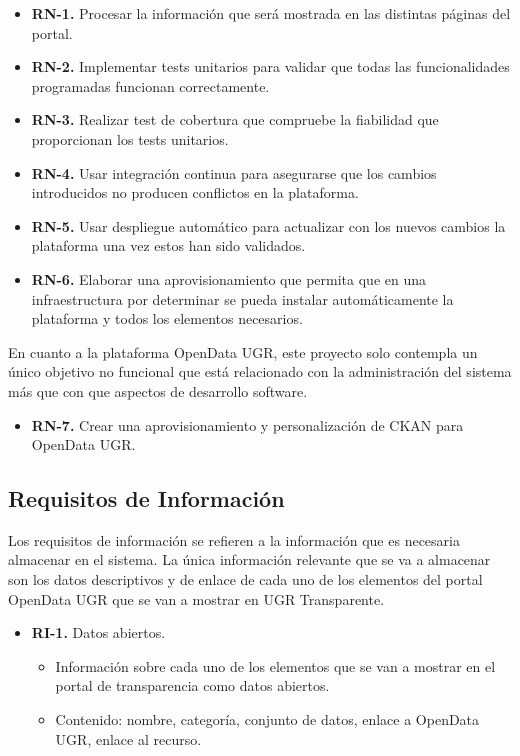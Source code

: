 \begin{itemize}
  \item \textbf{RN-1.} Procesar la información que será mostrada en las distintas páginas del portal.
  \item \textbf{RN-2.} Implementar tests unitarios para validar que todas las funcionalidades programadas funcionan 
  correctamente.
  \item \textbf{RN-3.} Realizar test de cobertura que compruebe la fiabilidad que proporcionan los tests unitarios.
  \item \textbf{RN-4.} Usar integración continua para asegurarse que los cambios introducidos no producen conflictos en la 
  plataforma.
  \item \textbf{RN-5.} Usar despliegue automático para actualizar con los nuevos cambios la plataforma una vez estos han sido 
  validados.
  \item \textbf{RN-6.} Elaborar una aprovisionamiento que permita que en una infraestructura por determinar se pueda instalar 
  automáticamente la plataforma y todos los elementos necesarios.
\end{itemize}

En cuanto a la plataforma OpenData UGR, este proyecto solo contempla un único objetivo no funcional que está relacionado con
la administración del sistema más que con que aspectos de desarrollo software.

\begin{itemize}
  \item \textbf{RN-7.} Crear una aprovisionamiento y personalización de CKAN para OpenData UGR.
\end{itemize}

\subsection{Requisitos de Información}

Los requisitos de información se refieren a la información que es necesaria almacenar en el sistema. La única información 
relevante que se va a almacenar son los datos descriptivos y de enlace de cada uno de los elementos del portal OpenData UGR 
que se van a mostrar en UGR Transparente.

\begin{itemize}
  \item \textbf{RI-1.} Datos abiertos.
  \begin{itemize}
    \item Información sobre cada uno de los elementos que se van a mostrar en el portal de transparencia como datos abiertos.
    \item Contenido: nombre, categoría, conjunto de datos, enlace a OpenData UGR, enlace al recurso.
  \end{itemize}
\end{itemize}

